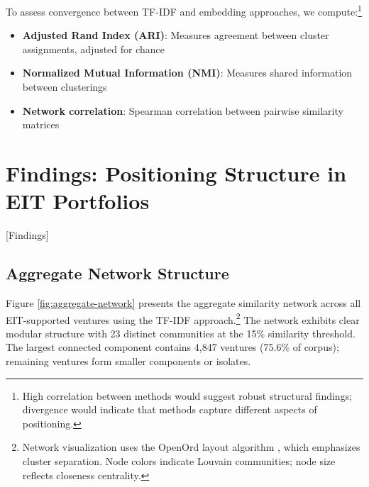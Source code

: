 \documentclass[../main.tex]{subfiles}
\begin{document}
To assess convergence between TF-IDF and embedding approaches, we compute:\footnote{High correlation between methods would suggest robust structural findings; divergence would indicate that methods capture different aspects of positioning.}

\begin{itemize}
    \item \textbf{Adjusted Rand Index (ARI)}: Measures agreement between cluster assignments, adjusted for chance
    \item \textbf{Normalized Mutual Information (NMI)}: Measures shared information between clusterings
    \item \textbf{Network correlation}: Spearman correlation between pairwise similarity matrices
\end{itemize}

\section{Findings: Positioning Structure in EIT Portfolios}[Findings]

\subsection{Aggregate Network Structure}

Figure \ref{fig:aggregate-network} presents the aggregate similarity network across all EIT-supported ventures using the TF-IDF approach.\footnote{Network visualization uses the OpenOrd layout algorithm \cite{martin2011openord}, which emphasizes cluster separation. Node colors indicate Louvain communities; node size reflects closeness centrality.} The network exhibits clear modular structure with 23 distinct communities at the 15\% similarity threshold. The largest connected component contains 4,847 ventures (75.6\% of corpus); remaining ventures form smaller components or isolates.

\begin{center}
\end{center}
\end{document}
